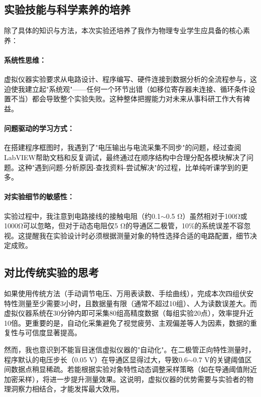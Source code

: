 \documentclass[11pt]{article}
\begin{document}
\subsection{实验技能与科学素养的培养}

除了具体的知识与方法，本次实验还培养了我作为物理专业学生应具备的核心素养：

\paragraph{系统性思维：}虚拟仪器实验要求从电路设计、程序编写、硬件连接到数据分析的全流程参与，这迫使我建立起"系统观"——任何一个环节出错（如移位寄存器未连接、循环条件设置不当）都会导致整个实验失败。这种整体把握能力对未来从事科研工作大有裨益。

\paragraph{问题驱动的学习方式：}在搭建程序框图时，我遇到了"电压输出与电流采集不同步"的问题，经过查阅LabVIEW帮助文档和反复调试，最终通过在顺序结构中合理分配各模块解决了问题。这种"遇到问题-分析原因-查找资料-尝试解决"的过程，比单纯听课学到的更多。

\paragraph{对实验细节的敏感性：}实验过程中，我注意到电路接线的接触电阻（约0.1$\sim$0.5 Ω）虽然相对于100Ω或1000Ω可以忽略，但对于动态电阻仅5 Ω的导通区二极管，10\%的系统误差不容忽视。这提醒我在实验设计时必须根据测量对象的特性选择合适的电路配置，细节决定成败。

\subsection{对比传统实验的思考}

如果使用传统方法（手动调节电压、万用表读数、手绘曲线），完成本次四组伏安特性测量至少需要3小时，且数据量有限（通常不超过10组）、人为读数误差大。而虚拟仪器系统在30分钟内即可采集80组高精度数据（每组实验20点），效率提升近10倍。更重要的是，自动化采集避免了视觉疲劳、主观偏差等人为因素，数据的重复性与可信度显著提高。

然而，我也意识到不能盲目迷信虚拟仪器的"自动化"。在二极管正向特性测量时，程序默认的电压步长（0.05 V）在导通区显得过大，导致0.6$\sim$0.7 V的关键阈值区间数据点稍显稀疏。若能根据实验对象特性动态调整采样策略（如在导通阈值附近加密采样），将进一步提升测量效果。这说明，虚拟仪器的优势需要与实验者的物理洞察力相结合，才能发挥最大效用。
\end{document}
